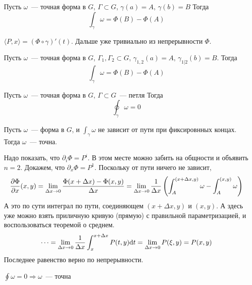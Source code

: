 \documentclass[12pt,timbord]{../../../notes}
\begin{document}
\begin{thrm}\label{thrm:lineint::precforms::precint}
  Пусть $\omega$~--- точная форма в  $G$, $\Gamma \subset G$, $\gamma(a)=A$, $\gamma(b)=B$
  Тогда
  \[
    \int_\gamma \omega = \Phi(B) - \Phi(A)
  \]
\end{thrm}
\begin{ittproof}
  $\langle P, x \rangle = (\Phi \circ \gamma)' (t)$. Дальше уже тривиально из непрерывности
  $\Phi$.
\end{ittproof}

\begin{thrm}\label{thrm:lineint::precforms::precint2}
  Пусть $\omega$~--- точная форма в  $G$, $\Gamma_1, \Gamma_2 \subset G$,
  $\gamma_{1,2}(a)=A$, $\gamma_{1|2}(b)=B$.
  Тогда
  \[
    \int_\gamma \omega = \Phi(B) - \Phi(A)
  \]
\end{thrm}

\begin{thrm}\label{thrm:lineint::precforms::loopint}
  Пусть $\omega$~--- точная форма в  $G$, $\Gamma \subset G$~--- петля
  Тогда
  \[
    \oint_\gamma \omega = 0
  \]
\end{thrm}

\begin{thrm}\label{thrm:lineint::precforms::critprec}
  Пусть $\omega$~--- форма в  $G$, и $\int_\gamma \omega $ не зависит от пути при фиксировнных
  концах. Тогда $\omega$~--- точна.
\end{thrm}

\begin{ittproof}
  Надо показать, что $\partial_i \Phi = P^i$. В этом месте можно забить на общности и объявить
  $n=2$. Докажем, что $\partial_x \Phi = P^1$. Поскольку от пути ничего не зависит,
  \[
    \frac{\partial \Phi}{\partial x}(x,y) = \lim_{\Delta x\to 0}\frac{\Phi(x+\Delta x)- \Phi(x,y)}{\Delta x} = 
    \lim_{\Delta x\to 0} \frac{1}{\Delta x} \left(\int_A^{{(x+\Delta x,y)}} \omega - 
    \int_A^{(x,y)} \omega\right)
  \]
  А это по сути интеграл по пути, соединяющем $(x+\Delta x, y)$ и $(x, y)$. А здесь уже можно
  взять приличную кривую (прямую) с правильной параметризацией, и воспользоваться теоремой о
  среднем.
  \[
    \cdots = \lim_{\Delta x \to 0} \frac{1}{\Delta x} \int_{x}^{x+\Delta x} P(t, y) \mathrm{d} t = 
    \lim_{\Delta x \to 0} P(\xi, y) = P(x,y)
  \]
  Последнее равенство верно по непрерывности.
\end{ittproof}

\begin{thrm}\label{thrm:lineint::precforms::critprecloop}
  $\displaystyle \oint \omega =0 \Rightarrow \omega$~--- точна
\end{thrm}
\end{document}
